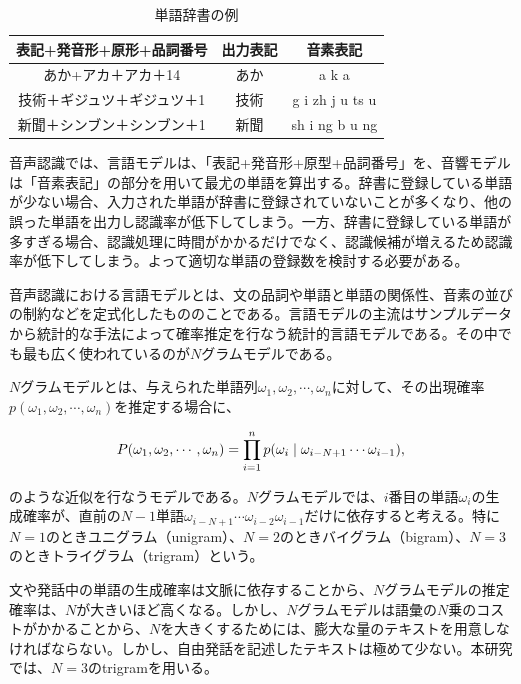 \begin{table}[H]
  \begin{center}
    \caption{単語辞書の例}
    \begin{tabular}{|c||c|c|} \hline
      表記+発音形+原形+品詞番号 & 出力表記 & 音素表記 \\ \hline
      あか+アカ＋アカ＋14 & あか & a k a \\ \hline
      技術＋ギジュツ＋ギジュツ＋1 & 技術 & g i zh j u ts u \\ \hline
      新聞＋シンブン＋シンブン＋1 & 新聞 & sh i ng b u ng \\ \hline
    \end{tabular}
    \label{table:tango}
  \end{center}
\end{table}

音声認識では、言語モデルは、「表記+発音形+原型+品詞番号」を、音響モデルは「音素表記」の部分を用いて最尤の単語を算出する。辞書に登録している単語が少ない場合、入力された単語が辞書に登録されていないことが多くなり、他の誤った単語を出力し認識率が低下してしまう。一方、辞書に登録している単語が多すぎる場合、認識処理に時間がかかるだけでなく、認識候補が増えるため認識率が低下してしまう。よって適切な単語の登録数を検討する必要がある。\vspace{0.2in}

\par
音声認識における言語モデルとは、文の品詞や単語と単語の関係性、音素の並びの制約などを定式化したもののことである。言語モデルの主流はサンプルデータから統計的な手法によって確率推定を行なう統計的言語モデルである。その中でも最も広く使われているのが$N$グラムモデルである。\vspace{0.2in}

\par
$N$グラムモデルとは、与えられた単語列$\omega_1,\omega_2,\cdots,\omega_n$に対して、その出現確率$p(\omega_1,\omega_2,\cdots,\omega_n)$を推定する場合に、

\begin{equation}
P(\omega_1,\omega_2,\cdots,\omega_n)=\prod_{i=1}^{n}p(\omega_{i}\mid \omega_{i-N+1}\cdots \omega_{i-1}), \notag
\end{equation}

のような近似を行なうモデルである。$N$グラムモデルでは、$i$番目の単語$ω_i$の生成確率が、直前の$N-1$単語$ω_{i-N+1}\cdots ω_{i-2}ω_{i-1}$だけに依存すると考える。特に$N = 1$のときユニグラム（unigram）、$N = 2$のときバイグラム（bigram）、$N = 3$のときトライグラム（trigram）という。\par
文や発話中の単語の生成確率は文脈に依存することから、$N$グラムモデルの推定確率は、$N$が大きいほど高くなる。しかし、$N$グラムモデルは語彙の$N$乗のコストがかかることから、$N$を大きくするためには、膨大な量のテキストを用意しなければならない。しかし、自由発話を記述したテキストは極めて少ない。本研究では、$N = 3$のtrigramを用いる。\par



